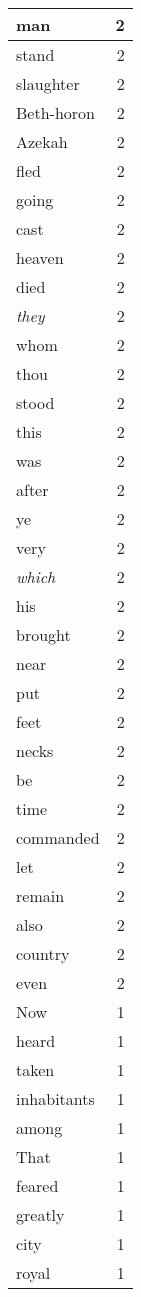 \begin{center}
\begin{longtable}{l|r}
man & 2 \\ \hline
stand & 2 \\ \hline
slaughter & 2 \\ \hline
Beth-horon & 2 \\ \hline
Azekah & 2 \\ \hline
fled & 2 \\ \hline
going & 2 \\ \hline
cast & 2 \\ \hline
heaven & 2 \\ \hline
died & 2 \\ \hline
\emph{they} & 2 \\ \hline
whom & 2 \\ \hline
thou & 2 \\ \hline
stood & 2 \\ \hline
this & 2 \\ \hline
was & 2 \\ \hline
after & 2 \\ \hline
ye & 2 \\ \hline
very & 2 \\ \hline
\emph{which} & 2 \\ \hline
his & 2 \\ \hline
brought & 2 \\ \hline
near & 2 \\ \hline
put & 2 \\ \hline
feet & 2 \\ \hline
necks & 2 \\ \hline
be & 2 \\ \hline
time & 2 \\ \hline
commanded & 2 \\ \hline
let & 2 \\ \hline
remain & 2 \\ \hline
also & 2 \\ \hline
country & 2 \\ \hline
even & 2 \\ \hline
Now & 1 \\ \hline
heard & 1 \\ \hline
taken & 1 \\ \hline
inhabitants & 1 \\ \hline
among & 1 \\ \hline
That & 1 \\ \hline
feared & 1 \\ \hline
greatly & 1 \\ \hline
city & 1 \\ \hline
royal & 1 \\ \hline

\end{longtable}
\end{center}
